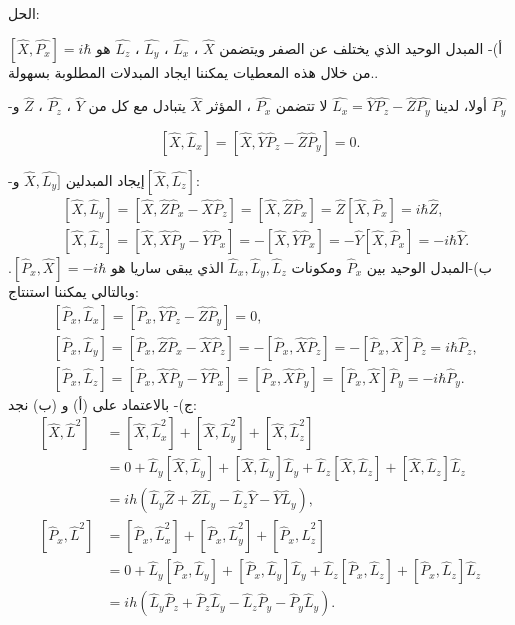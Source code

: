 الحل:

أ)- المبدل الوحيد الذي يختلف عن الصفر ويتضمن $\hat{X}$ ، $\hat{L_{x}}$ ، $\hat{L_{y}}$ ، $\hat{L_{z}}$   هو 
$[\hat{X},\hat{P_{x}} ]=i\hbar$.من خلال هذه المعطيات يمكننا ايجاد المبدلات المطلوبة بسهولة.

-أولا، لدينا 
$	\hat{L_{x}}  =   \hat{Y}\hat{P_{z}} - \hat{Z}\hat{P_{y}}$
 لا تتضمن  $\hat{P_{x}}$  ، المؤثر $\hat{X}$ يتبادل مع كل من $\hat{Y}$ ، $\hat{P_{z}}$ ، $\hat{Z}$  و  $\hat{P_{y}}$ 

$$
\left[\hat{X}, \hat{L}_x\right]=\left[\hat{X}, \hat{Y} \hat{P}_z-\hat{Z} \hat{P}_y\right]=0 .
$$

 -إيجاد المبدلين  $\hat{X}, \hat{L_{y}} ]$ و$[\hat{X}, \hat{L_{z}} ]$:
$$
\begin{aligned}
	& {\left[\hat{X}, \hat{L}_y\right]=\left[\hat{X}, \hat{Z} \hat{P}_x-\hat{X} \hat{P}_z\right]=\left[\hat{X}, \hat{Z} \hat{P}_x\right]=\hat{Z}\left[\hat{X}, \hat{P}_x\right]=i \hbar \hat{Z},} \\
	& {\left[\hat{X}, \hat{L}_z\right]=\left[\hat{X}, \hat{X} \hat{P}_y-\hat{Y} \hat{P}_x\right]=-\left[\hat{X}, \hat{Y} \hat{P}_x\right]=-\hat{Y}\left[\hat{X}, \hat{P}_x\right]=-i \hbar \hat{Y} .}
\end{aligned}
$$
ب)-المبدل الوحيد بين $\hat{P}_x$ ومكونات  $\hat{L}_x, \hat{L}_y, \hat{L}_z$ الذي يبقى ساريا هو  $\left[\hat{P}_x, \hat{X}\right]=-i \hbar$.  وبالتالي يمكننا استنتاج:
$$
\begin{aligned}
	& {\left[\hat{P}_x, \hat{L}_x\right]=\left[\hat{P}_x, \hat{Y} \hat{P}_z-\hat{Z} \hat{P}_y\right]=0,} \\
	& {\left[\hat{P}_x, \hat{L}_y\right]=\left[\hat{P}_x, \hat{Z} \hat{P}_x-\hat{X} \hat{P}_z\right]=-\left[\hat{P}_x, \hat{X} \hat{P}_z\right]=-\left[\hat{P}_x, \hat{X}\right] \hat{P}_z=i \hbar \hat{P}_z,} \\
	& {\left[\hat{P}_x, \hat{L}_z\right]=\left[\hat{P}_x, \hat{X} \hat{P}_y-\hat{Y} \hat{P}_x\right]=\left[\hat{P}_x, \hat{X} \hat{P}_y\right]=\left[\hat{P}_x, \hat{X}\right] \hat{P}_y=-i \hbar \hat{P}_y .}
\end{aligned}
$$
ج)- بالاعتماد على (أ) و (ب) نجد:
$$
\begin{aligned}
	{\left[\hat{X}, \hat{L}^2\right] } & =\left[\hat{X}, \hat{L}_x^2\right]+\left[\hat{X}, \hat{L}_y^2\right]+\left[\hat{X}, \hat{L}_z^2\right] \\
	& =0+\hat{L}_y\left[\hat{X}, \hat{L}_y\right]+\left[\hat{X}, \hat{L}_y\right] \hat{L}_y+\hat{L}_z\left[\hat{X}, \hat{L}_z\right]+\left[\hat{X}, \hat{L}_z\right] \hat{L}_z \\
	& =i h\left(\hat{L}_y \hat{Z}+\hat{Z} \hat{L}_y-\hat{L}_z \hat{Y}-\hat{Y} \hat{L}_y\right), \\
	{\left[\hat{P}_x, \hat{L}^2\right] } & =\left[\hat{P}_x, \hat{L}_x^2\right]+\left[\hat{P}_x, \hat{L}_y^2\right]+\left[\hat{P}_x, \hat{L}_z^2\right] \\
	& =0+\hat{L}_y\left[\hat{P}_x, \hat{L}_y\right]+\left[\hat{P}_x, \hat{L}_y\right] \hat{L}_y+\hat{L}_z\left[\hat{P}_x, \hat{L}_z\right]+\left[\hat{P}_x, \hat{L}_z\right] \hat{L}_z \\
	& =i h\left(\hat{L}_y \hat{P}_z+\hat{P}_z \hat{L}_y-\hat{L}_z \hat{P}_y-\hat{P}_y \hat{L}_y\right) .
\end{aligned}
$$
